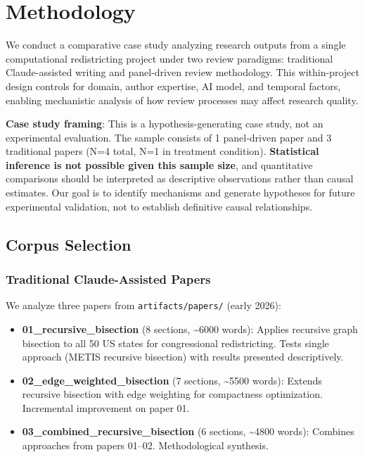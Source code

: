 \section{Methodology}
\label{sec:method}

We conduct a comparative case study analyzing research outputs from a single computational redistricting project under two review paradigms: traditional Claude-assisted writing and panel-driven review methodology. This within-project design controls for domain, author expertise, AI model, and temporal factors, enabling mechanistic analysis of how review processes may affect research quality.

\textbf{Case study framing}: This is a hypothesis-generating case study, not an experimental evaluation. The sample consists of 1 panel-driven paper and 3 traditional papers (N=4 total, N=1 in treatment condition). \textbf{Statistical inference is not possible given this sample size}, and quantitative comparisons should be interpreted as descriptive observations rather than causal estimates. Our goal is to identify mechanisms and generate hypotheses for future experimental validation, not to establish definitive causal relationships.

\subsection{Corpus Selection}

\subsubsection{Traditional Claude-Assisted Papers}

We analyze three papers from \texttt{artifacts/papers/} (early 2026):

\begin{itemize}[leftmargin=*]
\item \textbf{01\_recursive\_bisection} (8 sections, \textasciitilde6000 words): Applies recursive graph bisection to all 50 US states for congressional redistricting. Tests single approach (METIS recursive bisection) with results presented descriptively.

\item \textbf{02\_edge\_weighted\_bisection} (7 sections, \textasciitilde5500 words): Extends recursive bisection with edge weighting for compactness optimization. Incremental improvement on paper 01.

\item \textbf{03\_combined\_recursive\_bisection} (6 sections, \textasciitilde4800 words): Combines approaches from papers 01--02. Methodological synthesis.
\end{itemize}


